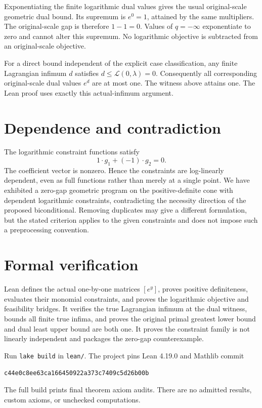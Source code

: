 \documentclass[11pt]{article}
\begin{document}
Exponentiating the finite logarithmic dual values gives the usual original-scale geometric dual bound. Its supremum is $e^0=1$, attained by the same multipliers. The original-scale gap is therefore $1-1=0$. Values of $q=-\infty$ exponentiate to zero and cannot alter this supremum. No logarithmic objective is subtracted from an original-scale objective.

For a direct bound independent of the explicit case classification, any finite Lagrangian infimum $d$ satisfies $d\le\mathcal L(0,\lambda)=0$. Consequently all corresponding original-scale dual values $e^d$ are at most one. The witness above attains one. The Lean proof uses exactly this actual-infimum argument.

\section*{Dependence and contradiction}
The logarithmic constraint functions satisfy
\[
 1\cdot g_1+(-1)\cdot g_2=0.
\]
The coefficient vector is nonzero. Hence the constraints are log-linearly dependent, even as full functions rather than merely at a single point. We have exhibited a zero-gap geometric program on the positive-definite cone with dependent logarithmic constraints, contradicting the necessity direction of the proposed biconditional. Removing duplicates may give a different formulation, but the stated criterion applies to the given constraints and does not impose such a preprocessing convention.

\section*{Formal verification}
Lean defines the actual one-by-one matrices $[e^y]$, proves positive definiteness, evaluates their monomial constraints, and proves the logarithmic objective and feasibility bridges. It verifies the true Lagrangian infimum at the dual witness, bounds all finite true infima, and proves the original primal greatest lower bound and dual least upper bound are both one. It proves the constraint family is not linearly independent and packages the zero-gap counterexample.

Run \texttt{lake build} in \texttt{lean/}. The project pins Lean 4.19.0 and Mathlib commit
\begin{center}\small\texttt{c44e0c8ee63ca166450922a373c7409c5d26b00b}\end{center}
The full build prints final theorem axiom audits. There are no admitted results, custom axioms, or unchecked computations.
\end{document}
